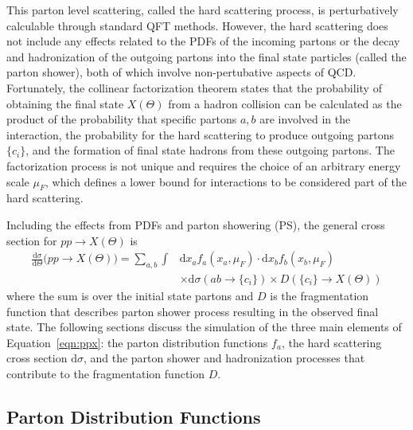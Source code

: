 This parton level scattering, called the hard scattering process, is perturbatively calculable through standard QFT methods.
However, the hard scattering does not include any effects related to the PDFs of the incoming partons or the decay and hadronization of the outgoing partons into the final state particles (called the parton shower), both of which involve non-pertubative aspects of QCD.
Fortunately, the collinear factorization theorem states that the probability of obtaining the final state $X(\Theta)$ from a hadron collision can be calculated as the product of the probability that specific partons $a,b$ are involved in the interaction, the probability for the hard scattering to produce outgoing partons $\{c_i\}$, and the formation of final state hadrons from these outgoing partons.
The factorization process is not unique and requires the choice of an arbitrary energy scale $\mu_F$, which defines a lower bound for interactions to be considered part of the hard scattering.  

Including the effects from PDFs and parton showering (PS), the general cross section for $pp \rightarrow X(\Theta)$ is
\begin{align}
  \label{eqn:ppx}
  \frac{\text{d}\sigma}{\text{d}\Theta} \Big(pp \rightarrow X(\Theta) \Big) =
  \sum_{a,b} \int & \text{d} x_a f_a(x_a, \mu_F) \cdot \text{d} x_b f_b(x_b, \mu_F)  \nonumber \\
  & \times \text{d}\sigma \left(ab \rightarrow \{c_i\} \right)
  \times D \left( \{c_i\} \rightarrow X(\Theta) \right) 
\end{align}
where the sum is over the initial state partons and $D$ is the fragmentation function that describes parton shower process resulting in the observed final state.
The following sections discuss the simulation of the three main elements of Equation~\ref{eqn:ppx}: the parton distribution functions $f_a$, the hard scattering cross section $\text{d}\sigma$, and the parton shower and hadronization processes that contribute to the fragmentation function $D$.

\subsection{Parton Distribution Functions}


